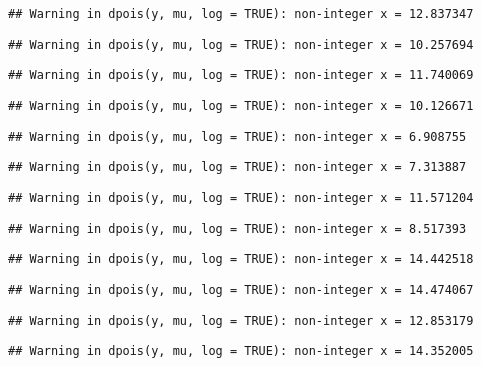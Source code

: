 \documentclass[
]{article}
\begin{document}
\begin{verbatim}
## Warning in dpois(y, mu, log = TRUE): non-integer x = 12.837347
\end{verbatim}

\begin{verbatim}
## Warning in dpois(y, mu, log = TRUE): non-integer x = 10.257694
\end{verbatim}

\begin{verbatim}
## Warning in dpois(y, mu, log = TRUE): non-integer x = 11.740069
\end{verbatim}

\begin{verbatim}
## Warning in dpois(y, mu, log = TRUE): non-integer x = 10.126671
\end{verbatim}

\begin{verbatim}
## Warning in dpois(y, mu, log = TRUE): non-integer x = 6.908755
\end{verbatim}

\begin{verbatim}
## Warning in dpois(y, mu, log = TRUE): non-integer x = 7.313887
\end{verbatim}

\begin{verbatim}
## Warning in dpois(y, mu, log = TRUE): non-integer x = 11.571204
\end{verbatim}

\begin{verbatim}
## Warning in dpois(y, mu, log = TRUE): non-integer x = 8.517393
\end{verbatim}

\begin{verbatim}
## Warning in dpois(y, mu, log = TRUE): non-integer x = 14.442518
\end{verbatim}

\begin{verbatim}
## Warning in dpois(y, mu, log = TRUE): non-integer x = 14.474067
\end{verbatim}

\begin{verbatim}
## Warning in dpois(y, mu, log = TRUE): non-integer x = 12.853179
\end{verbatim}

\begin{verbatim}
## Warning in dpois(y, mu, log = TRUE): non-integer x = 14.352005
\end{verbatim}
\end{document}
